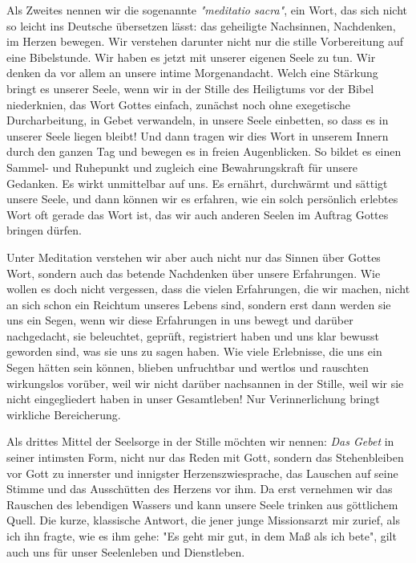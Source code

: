 \documentclass[a5paper,openany]{book}
\begin{document}
\par
Als Zweites nennen wir die sogenannte \emph{"meditatio sacra"}, ein Wort, das sich nicht so leicht ins Deutsche übersetzen lässt: das geheiligte Nachsinnen, Nachdenken, im Herzen bewegen. Wir verstehen darunter nicht nur die stille Vorbereitung auf eine Bibelstunde. Wir haben es jetzt mit unserer eigenen Seele zu tun. Wir denken da vor allem an unsere intime Morgenandacht. Welch eine Stärkung bringt es unserer Seele, wenn wir in der Stille des Heiligtums vor der Bibel niederknien, das Wort Gottes einfach, zunächst noch ohne exegetische Durcharbeitung, in Gebet verwandeln, in unsere Seele einbetten, so dass es in unserer Seele liegen bleibt! Und dann tragen wir dies Wort in unserem Innern durch den ganzen Tag und bewegen es in freien Augenblicken. So bildet es einen Sammel- und Ruhepunkt und zugleich eine Bewahrungskraft für unsere Gedanken. Es wirkt unmittelbar auf uns. Es ernährt, durchwärmt und sättigt unsere Seele, und dann können wir es erfahren, wie ein solch persönlich erlebtes Wort oft gerade das Wort ist, das wir auch anderen Seelen im Auftrag Gottes bringen dürfen.
\par
Unter Meditation verstehen wir aber auch nicht nur das Sinnen über Gottes Wort, sondern auch das betende Nachdenken über unsere Erfahrungen. Wie wollen es doch nicht vergessen, dass die vielen Erfahrungen, die  wir machen, nicht an sich schon ein Reichtum unseres Lebens sind, sondern erst dann werden sie uns ein Segen, wenn wir diese Erfahrungen in uns bewegt und darüber nachgedacht, sie beleuchtet, geprüft, registriert haben und uns klar bewusst geworden sind, was sie uns zu sagen haben. Wie viele Erlebnisse, die uns ein Segen hätten sein können, blieben unfruchtbar und wertlos und rauschten wirkungslos vorüber, weil wir nicht darüber nachsannen in der Stille, weil wir sie nicht eingegliedert haben in unser Gesamtleben! Nur Verinnerlichung bringt wirkliche Bereicherung.
\par
Als drittes Mittel der Seelsorge in der Stille möchten wir nennen: \emph{Das Gebet} in seiner intimsten Form, nicht nur das Reden mit Gott, sondern das Stehenbleiben vor Gott zu innerster und innigster Herzenszwiesprache, das Lauschen auf seine Stimme und das Ausschütten des Herzens vor ihm. Da erst vernehmen wir das Rauschen des lebendigen Wassers und kann unsere Seele trinken aus göttlichem Quell. Die kurze, klassische Antwort, die jener junge Missionsarzt mir zurief, als ich ihn fragte, wie es ihm gehe: "Es geht mir gut, in dem Maß als ich bete", gilt auch uns für unser Seelenleben und Dienstleben.
\end{document}
